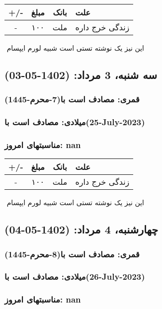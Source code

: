 \documentclass{article}
\newcommand{\rnote}[1]{\marginpar{\textcolor{color}{\StrSubstitute{\##1}{ }{\_}}}}
\newcommand{\myRow}[4]{
    #1 & #2 & #3 & #4 \\ \hline
}
\begin{document}
\begin{tabular}{ | c | c | c | p{5cm} |}
    \hline
    \myRow{ +/- }{مبلغ}{بانک}{علت}
    \myRow{-}{۱۰۰}{ملت}{زندگی خرج داره}
\end{tabular}
\newline
\newline

‌
\rnote{تست}
این نیز یک نوشته تستی است شبیه لورم ایپسام




\newpage
{}
\textcolor{color}{
\section{ سه شنبه، 3 مرداد: (1402-05-03) }
\subsubsection*{قمری: مصادف است با(7-محرم-1445)} 
\subsubsection*{میلادی: مصادف است با(25-July-2023)}
\subsubsection*{مناسبتهای امروز: nan}
}


\begin{tabular}{ | c | c | c | p{5cm} |}
    \hline
    \myRow{ +/- }{مبلغ}{بانک}{علت}
    \myRow{-}{۱۰۰}{ملت}{زندگی خرج داره}
\end{tabular}
\newline
\newline

‌
\rnote{تست}
این نیز یک نوشته تستی است شبیه لورم ایپسام




\newpage
{}
\textcolor{color}{
\section{ چهارشنبه، 4 مرداد: (1402-05-04) }
\subsubsection*{قمری: مصادف است با(8-محرم-1445)} 
\subsubsection*{میلادی: مصادف است با(26-July-2023)}
\subsubsection*{مناسبتهای امروز: nan}
}
\end{document}
